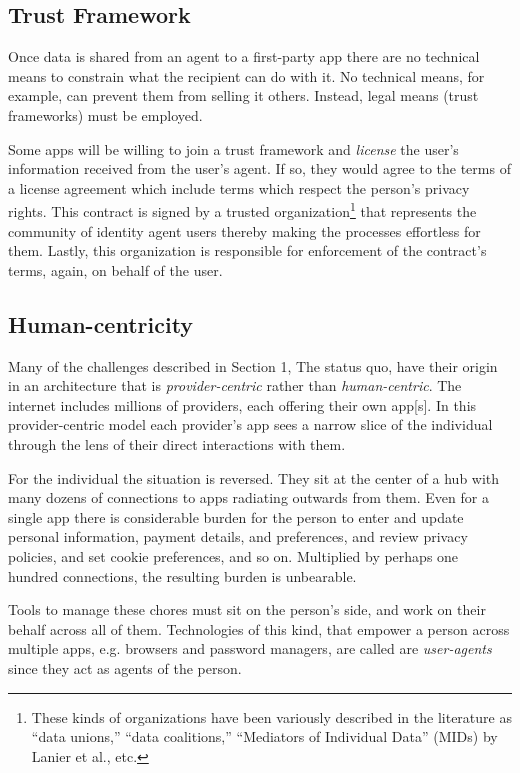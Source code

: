 \documentclass[11pt, oneside]{article}   	%
\begin{document}
\subsection{Trust Framework}

Once data is shared from an agent to a first-party app there are no technical means to constrain what the recipient can do with it. No technical means, for example, can prevent them from selling it others. Instead, legal means (trust frameworks) must be employed. 

Some apps will be willing to join a trust framework and \emph{license} the user's information received from the user's agent. If so, they would agree to the terms of a license agreement which include terms which respect the person's privacy rights. This contract is signed by a trusted organization\footnote{These kinds of organizations have been variously described in the literature as ``data unions,'' ``data coalitions,'' ``Mediators of Individual Data'' (MIDs) by Lanier et al.\cite{Lanier2018}, etc.} that represents the community of identity agent users thereby making the processes effortless for them. Lastly, this organization is responsible for enforcement of the contract's terms, again, on behalf of the user.

\subsection{Human-centricity}

Many of the challenges described in Section 1, The status quo, have their origin in an architecture that is \emph{provider-centric} rather than \emph{human-centric}. The internet includes millions of providers, each offering their own app[s]. In this provider-centric model each provider's app sees a narrow slice of the individual through the lens of their direct interactions with them. 

For the individual the situation is reversed. They sit at the center of a hub with many dozens of connections to apps radiating outwards from them. Even for a single app there is considerable burden for the person to enter and update personal information, payment details, and preferences, and review privacy policies, and set cookie preferences, and so on. Multiplied by perhaps one hundred connections, the resulting burden is unbearable. 

Tools to manage these chores must sit on the person's side, and work on their behalf across all of them. Technologies of this kind, that empower a person across multiple apps, e.g. browsers and password managers, are called are \emph{user-agents} since they act as agents of the person. 
\end{document}
